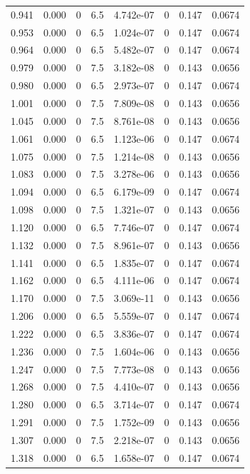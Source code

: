 \documentclass[preview]{standalone}
\begin{document}
{{{\begin{tabular}{L{1.2cm}C{1.2cm} C{0.3cm}C{0.5cm} C{1.4cm}C{1.4cm} C{1.4cm}C{1.4cm}}
  0.941  &  0.000  & 0     & 6.5 &  4.742e-07  & 0  & 0.147 &  0.0674   \\ 
  0.953  &  0.000  & 0     & 6.5 &  1.024e-07  & 0  & 0.147 &  0.0674   \\ 
  0.964  &  0.000  & 0     & 6.5 &  5.482e-07  & 0  & 0.147 &  0.0674   \\ 
  0.979  &  0.000  & 0     & 7.5 &  3.182e-08  & 0  & 0.143 &  0.0656   \\ 
  0.980  &  0.000  & 0     & 6.5 &  2.973e-07  & 0  & 0.147 &  0.0674   \\ 
  1.001  &  0.000  & 0     & 7.5 &  7.809e-08  & 0  & 0.143 &  0.0656   \\ 
  1.045  &  0.000  & 0     & 7.5 &  8.761e-08  & 0  & 0.143 &  0.0656   \\ 
  1.061  &  0.000  & 0     & 6.5 &  1.123e-06  & 0  & 0.147 &  0.0674   \\ 
  1.075  &  0.000  & 0     & 7.5 &  1.214e-08  & 0  & 0.143 &  0.0656   \\ 
  1.083  &  0.000  & 0     & 7.5 &  3.278e-06  & 0  & 0.143 &  0.0656   \\ 
  1.094  &  0.000  & 0     & 6.5 &  6.179e-09  & 0  & 0.147 &  0.0674   \\ 
  1.098  &  0.000  & 0     & 7.5 &  1.321e-07  & 0  & 0.143 &  0.0656   \\ 
  1.120  &  0.000  & 0     & 6.5 &  7.746e-07  & 0  & 0.147 &  0.0674   \\ 
  1.132  &  0.000  & 0     & 7.5 &  8.961e-07  & 0  & 0.143 &  0.0656   \\ 
  1.141  &  0.000  & 0     & 6.5 &  1.835e-07  & 0  & 0.147 &  0.0674   \\ 
  1.162  &  0.000  & 0     & 6.5 &  4.111e-06  & 0  & 0.147 &  0.0674   \\ 
  1.170  &  0.000  & 0     & 7.5 &  3.069e-11  & 0  & 0.143 &  0.0656   \\ 
  1.206  &  0.000  & 0     & 6.5 &  5.559e-07  & 0  & 0.147 &  0.0674   \\ 
  1.222  &  0.000  & 0     & 6.5 &  3.836e-07  & 0  & 0.147 &  0.0674   \\ 
  1.236  &  0.000  & 0     & 7.5 &  1.604e-06  & 0  & 0.143 &  0.0656   \\ 
  1.247  &  0.000  & 0     & 7.5 &  7.773e-08  & 0  & 0.143 &  0.0656   \\ 
  1.268  &  0.000  & 0     & 7.5 &  4.410e-07  & 0  & 0.143 &  0.0656   \\ 
  1.280  &  0.000  & 0     & 6.5 &  3.714e-07  & 0  & 0.147 &  0.0674   \\ 
  1.291  &  0.000  & 0     & 7.5 &  1.752e-09  & 0  & 0.143 &  0.0656   \\ 
  1.307  &  0.000  & 0     & 7.5 &  2.218e-07  & 0  & 0.143 &  0.0656   \\ 
  1.318  &  0.000  & 0     & 6.5 &  1.658e-07  & 0  & 0.147 &  0.0674   \\ 
\hline 
\end{tabular} 

}}}
\end{document}
